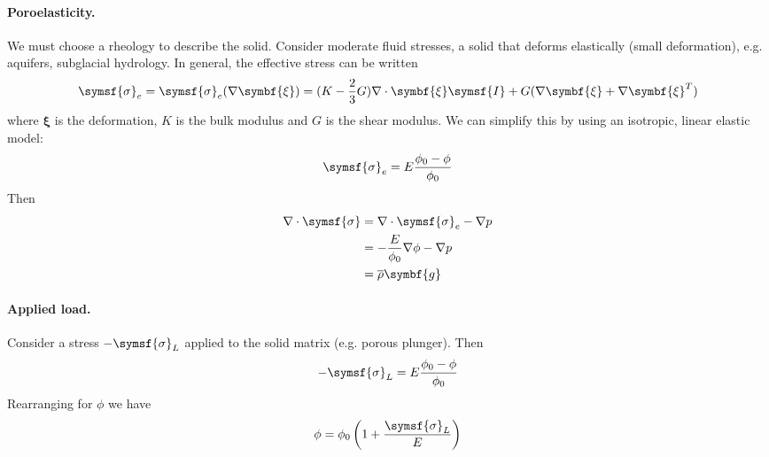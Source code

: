 \documentclass{jknotes}
\begin{document}
\paragraph{Poroelasticity.} We must choose a rheology to describe the solid.
Consider moderate fluid stresses, a solid that deforms elastically (small
deformation), e.g. aquifers, subglacial hydrology. In general, the effective
stress can be written
\begin{equation}
	\symsf{\sigma}_e = \symsf{\sigma}_e(\nabla \symbf{\xi}) = (K -
	\frac{2}{3}G)\nabla\cdot\symbf{\xi}\symsf{I} + G(\nabla \symbf{\xi} +
	\nabla \symbf{\xi}^T)
\end{equation}
where $\symbf{\xi}$ is the deformation, $K$ is the bulk modulus and $G$ is the
shear modulus. We can simplify this by using an isotropic, linear elastic
model:
\begin{equation}
	\symsf{\sigma}_e = E\frac{\phi_0 - \phi}{\phi_0}
\end{equation}
Then
\begin{align}
	\nabla \cdot \symsf{\sigma} &= \nabla \cdot \symsf{\sigma}_e - \nabla p
	\\
								&= -\frac{E}{\phi_0}\nabla \phi - \nabla p \\
								&= \overline{\rho}\symbf{g}
\end{align}

\paragraph{Applied load.} Consider a stress $-\symsf{\sigma}_L$ applied to the
solid matrix (e.g. porous plunger). Then
\begin{equation}
	-\symsf{\sigma}_L = E \frac{\phi_0 - \phi}{\phi_0}
\end{equation}
Rearranging for $\phi$ we have
\begin{equation}
	\phi = \phi_0\left(1+\frac{\symsf{\sigma}_L}{E}\right)
\end{equation}
\end{document}
